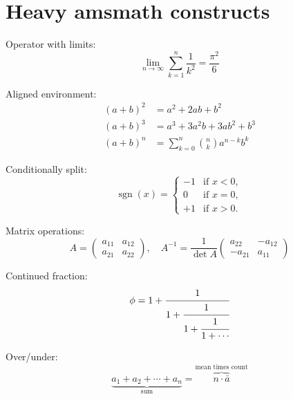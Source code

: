 \documentclass{article}
\begin{document}
\section{Heavy amsmath constructs}

Operator with limits:
\[
\lim_{n \to \infty} \sum_{k=1}^{n} \frac{1}{k^2} = \frac{\pi^2}{6}
\]

Aligned environment:
\begin{align}
  (a + b)^2 &= a^2 + 2ab + b^2 \\
  (a + b)^3 &= a^3 + 3a^2 b + 3ab^2 + b^3 \\
  (a + b)^n &= \sum_{k=0}^{n} \binom{n}{k} a^{n-k} b^k
\end{align}

Conditionally split:
\[
\operatorname{sgn}(x) = \begin{cases}
  -1 & \text{if } x < 0, \\
  0 & \text{if } x = 0, \\
  +1 & \text{if } x > 0.
\end{cases}
\]

Matrix operations:
\[
A = \begin{pmatrix} a_{11} & a_{12} \\ a_{21} & a_{22} \end{pmatrix}, \quad
A^{-1} = \frac{1}{\det A} \begin{pmatrix} a_{22} & -a_{12} \\ -a_{21} & a_{11} \end{pmatrix}
\]

Continued fraction:
\[
\phi = 1 + \cfrac{1}{1 + \cfrac{1}{1 + \cfrac{1}{1 + \cdots}}}
\]

Over/under:
\[
\underbrace{a_1 + a_2 + \cdots + a_n}_{\text{sum}} = \overbrace{n \cdot \bar a}^{\text{mean times count}}
\]
\end{document}
